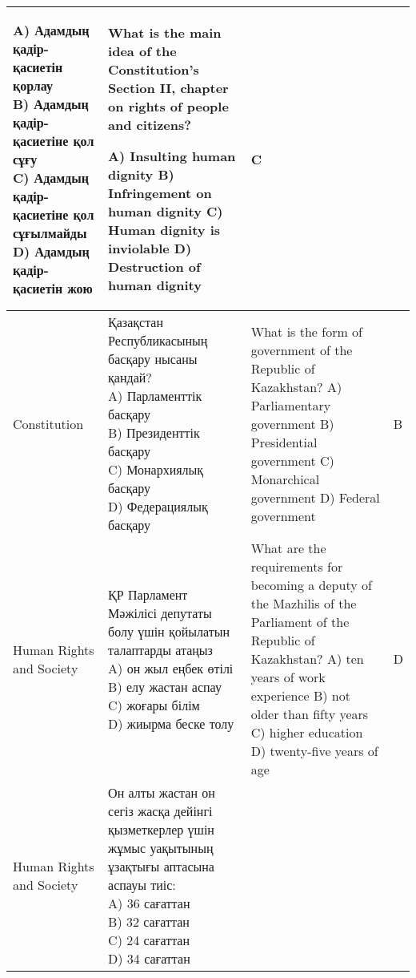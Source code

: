 \begin{table*}[ht]
\begin{tabular}{|p{2cm}|p{5cm}|p{5cm}|p{1cm}|}
{A) Адамдың қадір-қасиетін қорлау \newline
B) Адамдың қадір-қасиетіне қол сұғу\newline
C) Адамдың қадір-қасиетіне қол сұғылмайды \newline
D) Адамдың қадір-қасиетін жою\newline
}&
What is the main idea of the Constitution's Section II, chapter on rights of people and citizens? \newline

A) Insulting human dignity \newline
B) Infringement on human dignity\newline
C) Human dignity is inviolable \newline
D) Destruction of human dignity\newline
&
C \\
\hline
Constitution &
\foreignlanguage{russian}{
Қазақстан Республикасының басқару нысаны қандай? \newline
A) Парламенттік басқару \newline
B) Президенттік басқару\newline
C) Монархиялық басқару \newline
D) Федерациялық басқару \newline
} & 
What is the form of government of the Republic of Kazakhstan? \newline
A) Parliamentary government \newline
B) Presidential government\newline
C) Monarchical government \newline
D) Federal government \newline
& B \\
\hline
Human Rights and Society &
\foreignlanguage{russian}{
ҚР Парламент Мәжілісі депутаты болу үшін қойылатын талаптарды атаңыз \newline
A) он жыл еңбек өтілі\newline
B) елу жастан аспау\newline
C) жоғары білім\newline
D) жиырма беске толу\newline

} & 
What are the requirements for becoming a deputy of the Mazhilis of the Parliament of the Republic of Kazakhstan?\newline
A) ten years of work experience\newline
B) not older than fifty years\newline
C) higher education\newline
D) twenty-five years of age\newline
& D\\
\hline
Human Rights and Society & 
\foreignlanguage{russian}{
Он алты жастан он сегіз жасқа дейінгі қызметкерлер үшін жұмыс уақытының ұзақтығы аптасына аспауы тиіс:\newline
A) 36 сағаттан\newline
B) 32 сағаттан\newline
C) 24 сағаттан\newline
D) 34 сағаттан\newline
}&


\end{tabular}
\end{table*}
